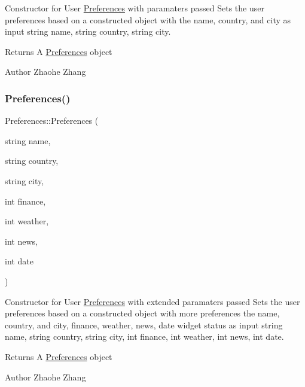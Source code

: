 Constructor for User \mbox{\hyperlink{class_preferences}{Preferences}} with paramaters passed  Sets the user preferences based on a constructed object with the name, country, and city as input  string name, string country, string city. 

\begin{DoxyReturn}{Returns}
A \mbox{\hyperlink{class_preferences}{Preferences}} object 
\end{DoxyReturn}
\begin{DoxyAuthor}{Author}
Zhaohe Zhang 
\end{DoxyAuthor}
\mbox{\label{class_preferences_af8b8a891846a7c555e3c7861bc2c1841}} 
\subsubsection{\texorpdfstring{Preferences()}{Preferences()}\hspace{0.1cm}{\footnotesize\ttfamily [3/3]}}
{\footnotesize\ttfamily Preferences\+::\+Preferences (\begin{DoxyParamCaption}\item[{string}]{name,  }\item[{string}]{country,  }\item[{string}]{city,  }\item[{int}]{finance,  }\item[{int}]{weather,  }\item[{int}]{news,  }\item[{int}]{date }\end{DoxyParamCaption})}



Constructor for User \mbox{\hyperlink{class_preferences}{Preferences}} with extended paramaters passed  Sets the user preferences based on a constructed object with more preferences the name, country, and city, finance, weather, news, date widget status as input  string name, string country, string city, int finance, int weather, int news, int date. 

\begin{DoxyReturn}{Returns}
A \mbox{\hyperlink{class_preferences}{Preferences}} object 
\end{DoxyReturn}
\begin{DoxyAuthor}{Author}
Zhaohe Zhang 
\end{DoxyAuthor}
\mbox{\label{class_preferences_a20020f4fceeefb048a5eeddec6c28376}} 

